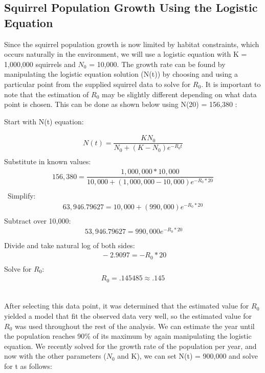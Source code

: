 \documentclass[12pt]{article}
\begin{document}
\subsection*{Squirrel Population Growth Using the Logistic Equation}
Since the squirrel population growth is now limited by habitat constraints, which occurs naturally in the environment, we will use a logistic equation with K = 1,000,000 squirrels and $N_0$ = 10,000. The growth rate can be found by manipulating the logistic equation solution (N(t)) by choosing and using a particular point from the supplied squirrel data to solve for $R_0$. It is important to note that the estimation of $R_0$ may be slightly different depending on what data point is chosen. This can be done as shown below using N(20) = 156,380 :\\

\begin{flushleft}
Start with N(t) equation:
\end{flushleft}
\begin{gather*}
N(t) = \dfrac{KN_0}{N_0+(K-N_0)e^{-R_0t}} \\
\end{gather*}
Substitute in known values:
\begin{gather*}
156,380 = \dfrac{1,000,000*10,000}{10,000+(1,000,000-10,000)e^{-R_0*20}} \\
\end{gather*}\
Simplify:	
\begin{gather*}
63,946.79627 = 10,000+(990,000)e^{-R_0*20} \\
\end{gather*}
Subtract over 10,000:		
\begin{gather*}\
53,946.79627 = 990,000e^{-R_0*20} \\
\end{gather*}
Divide and take natural log of both sides:	
\begin{gather*}\
-2.9097 = -R_0*20 \\
\end{gather*}
Solve for $R_0$:	
\begin{gather*}
R_0 = .145485 \approx .145
\end{gather*}\

After selecting this data point, it was determined that the estimated value for $R_0$ yielded a model that fit the observed data very well, so the estimated value for $R_0$ was used throughout the rest of the analysis. We can estimate the year until the population reaches 90\% of its maximum by again manipulating the logistic equation. We recently solved for the growth rate of the population per year, and now with the other parameters ($N_0$ and K), we can set N(t) = 900,000 and solve for t as follows:\\\
\end{document}
